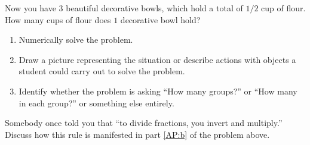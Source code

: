 \begin{prob} 
Now you have $3$ beautiful decorative bowls, which hold a total of
$1/2$ cup of flour. How many cups of flour does $1$ decorative bowl
hold?
\begin{enumerate}
\item Numerically solve the problem.
\item Draw a picture representing the situation or describe actions with objects a student could carry out to solve the problem.
\item Identify whether the problem is asking ``How many groups?'' or ``How many in each group?'' or something else entirely.
\end{enumerate}
\end{prob}

\begin{prob}
Somebody once told you that ``to divide fractions, you invert and
multiply.'' Discuss how this rule is manifested in part \ref{AP:b} of
the problem above.
\end{prob}
